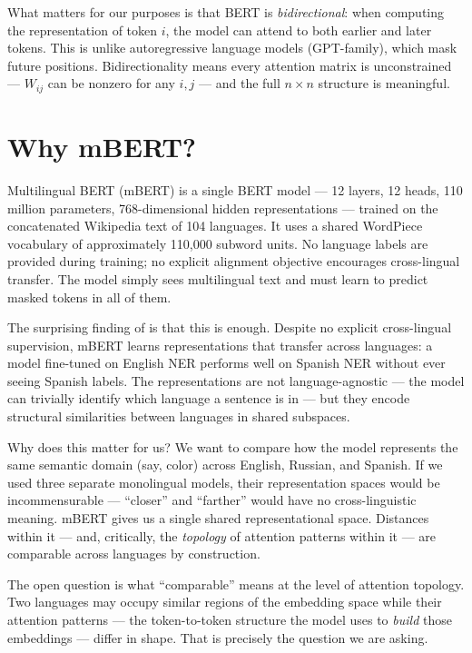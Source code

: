What matters for our purposes is that BERT is \emph{bidirectional}: when computing the representation of token $i$, the model can attend to both earlier and later tokens. This is unlike autoregressive language models (GPT-family), which mask future positions. Bidirectionality means every attention matrix is unconstrained --- $W_{ij}$ can be nonzero for any $i, j$ --- and the full $n \times n$ structure is meaningful.

\section{Why mBERT?}

Multilingual BERT (mBERT) is a single BERT model --- 12 layers, 12 heads, 110 million parameters, 768-dimensional hidden representations --- trained on the concatenated Wikipedia text of 104 languages. It uses a shared WordPiece vocabulary of approximately 110,000 subword units. No language labels are provided during training; no explicit alignment objective encourages cross-lingual transfer. The model simply sees multilingual text and must learn to predict masked tokens in all of them.

The surprising finding of \textcite{pires2019} is that this is enough. Despite no explicit cross-lingual supervision, mBERT learns representations that transfer across languages: a model fine-tuned on English NER performs well on Spanish NER without ever seeing Spanish labels. The representations are not language-agnostic --- the model can trivially identify which language a sentence is in --- but they encode structural similarities between languages in shared subspaces.

Why does this matter for us? We want to compare how the model represents the same semantic domain (say, color) across English, Russian, and Spanish. If we used three separate monolingual models, their representation spaces would be incommensurable --- ``closer'' and ``farther'' would have no cross-linguistic meaning. mBERT gives us a single shared representational space. Distances within it --- and, critically, the \emph{topology} of attention patterns within it --- are comparable across languages by construction.

The open question is what ``comparable'' means at the level of attention topology. Two languages may occupy similar regions of the embedding space while their attention patterns --- the token-to-token structure the model uses to \emph{build} those embeddings --- differ in shape. That is precisely the question we are asking.

